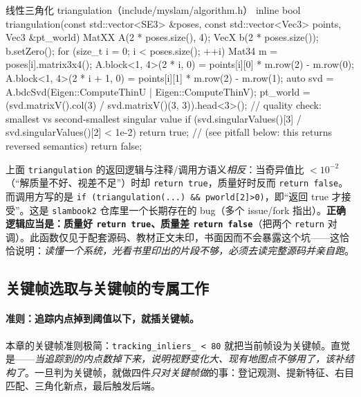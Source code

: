 \begin{codebox}[C++]{线性三角化 triangulation（include/myslam/algorithm.h）}
inline bool triangulation(const std::vector<SE3> &poses,
                          const std::vector<Vec3> points, Vec3 &pt_world) {
    MatXX A(2 * poses.size(), 4);
    VecX b(2 * poses.size());  b.setZero();
    for (size_t i = 0; i < poses.size(); ++i) {
        Mat34 m = poses[i].matrix3x4();
        A.block<1, 4>(2 * i, 0)     = points[i][0] * m.row(2) - m.row(0);
        A.block<1, 4>(2 * i + 1, 0) = points[i][1] * m.row(2) - m.row(1);
    }
    auto svd = A.bdcSvd(Eigen::ComputeThinU | Eigen::ComputeThinV);
    pt_world = (svd.matrixV().col(3) / svd.matrixV()(3, 3)).head<3>();
    // quality check: smallest vs second-smallest singular value
    if (svd.singularValues()[3] / svd.singularValues()[2] < 1e-2)
        return true;        // (see pitfall below: this returns reversed semantics)
    return false;
}
\end{codebox}

\begin{pitfall}
上面 \texttt{triangulation} 的返回逻辑与注释/调用方语义\emph{相反}：当奇异值比 $<10^{-2}$（“解质量不好、视差不足”）时却 \verb|return true|，质量好时反而 \verb|return false|。而调用方写的是 \verb|if (triangulation(...) && pworld[2]>0)|，即“返回 true 才接受”。这是 \texttt{slambook2} 仓库里一个长期存在的 bug（多个 issue/fork 指出）。\textbf{正确逻辑应当是：质量好 \texttt{return true}、质量差 \texttt{return false}}（把两个 \texttt{return} 对调）。此函数仅见于配套源码、教材正文未印，书面因而不会暴露这个坑——这恰恰说明：\emph{读懂一个系统，光看书里印出的片段不够，必须去读完整源码并亲自跑}。
\end{pitfall}

\subsection{关键帧选取与关键帧的专属工作}
\label{sec:sys-keyframe}

\paragraph{准则：追踪内点掉到阈值以下，就插关键帧。}
本章的关键帧准则极简：\texttt{tracking\_inliers\_ < 80} 就把当前帧设为关键帧。直觉是——\emph{当追踪到的内点数掉下来，说明视野变化大、现有地图点不够用了，该补结构了}。一旦判为关键帧，就做四件\emph{只对关键帧做}的事：登记观测、提新特征、右目匹配、三角化新点，最后触发后端。

